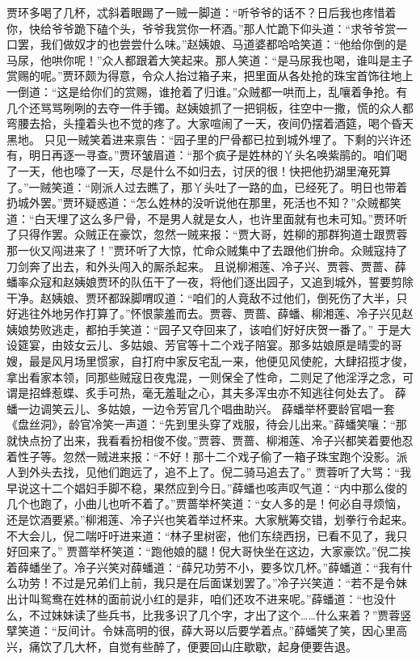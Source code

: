 \documentclass[12pt,oneside]{book}
\begin{document}
贾环多喝了几杯，忒斜着眼踢了一贼一脚道：“听爷爷的话不？日后我也疼惜着你，快给爷爷跪下磕个头，爷爷我赏你一杯酒。”那人忙跪下仰头道：“求爷爷赏一口罢，我们做奴才的也尝尝什么味。”赵姨娘、马道婆都哈哈笑道：“他给你倒的是马尿，他哄你呢！”众人都跟着大笑起来。那人笑道：“是马尿我也喝，谁叫是主子赏赐的呢。”贾环颇为得意，令众人抬过箱子来，把里面从各处抢的珠宝首饰往地上一倒道：“这是给你们的赏赐，谁抢着了归谁。”众贼都一哄而上，乱嚷着争抢。有几个还骂骂咧咧的去夺一件手镯。赵姨娘抓了一把铜板，往空中一撒，慌的众人都弯腰去拾，头撞着头也不觉的疼了。大家喧闹了一天，夜间仍摆着酒筵，喝个昏天黑地。
只见一贼笑着进来禀告：“园子里的尸骨都已拉到城外埋了。下剩的兴许还有，明日再逐一寻查。”贾环皱眉道：“那个疯子是姓林的丫头名唤紫鹃的。咱们喝了一天，他也嚎了一天，尽是什么不如归去，讨厌的很！快把他扔湖里淹死算了。”一贼笑道：“刚派人过去瞧了，那丫头吐了一路的血，已经死了。明日也带着扔城外罢。”贾环疑惑道：“怎么姓林的没听说他在那里，死活也不知？”众贼都笑道：“白天埋了这么多尸骨，不是男人就是女人，也许里面就有也未可知。”贾环听了只得作罢。众贼正在豪饮，忽然一贼来报：“贾大哥，姓柳的那群狗道士跟贾蓉那一伙又闯进来了！”贾环听了大惊，忙命众贼集中了去跟他们拚命。众贼寇持了刀剑奔了出去，和外头闯入的厮杀起来。
且说柳湘莲、冷子兴、贾蓉、贾蔷、薛蟠率众寇和赵姨娘贾环的队伍干了一夜，将他们逐出园子，又追到城外，誓要剪除干净。赵姨娘、贾环都跺脚喟叹道：“咱们的人竟敌不过他们，倒死伤了大半，只好逃往外地另作打算了。”怀恨蒙羞而去。贾蓉、贾蔷、薛蟠、柳湘莲、冷子兴见赵姨娘势败逃走，都拍手笑道：“园子又夺回来了，该咱们好好庆贺一番了。”
于是大设筵宴，由妓女云儿、多姑娘、芳官等十二个戏子陪宴。那多姑娘原是晴雯的哥嫂，最是风月场里惯家，自打府中家反宅乱一来，他便见风使舵，大肆招揽才俊，拿出看家本领，同那些贼寇日夜鬼混，一则保全了性命，二则足了他淫浮之念，可谓是招蜂惹蝶、炙手可热，毫无羞耻之心，其夫多浑虫亦不知逃往何处去了。
薛蟠一边调笑云儿、多姑娘，一边令芳官几个唱曲助兴。
薛蟠举杯要龄官唱一套《盘丝洞》，龄官冷笑一声道：“先到里头穿了戏服，待会儿出来。”薛蟠笑嚷：“那就快点扮了出来，我看看扮相俊不俊。”贾蓉、贾蔷、柳湘莲、冷子兴都笑着要他忍着性子等。忽然一贼进来报：“不好！那十二个戏子偷了一箱子珠宝跑个没影。派人到外头去找，见他们跑远了，追不上了。倪二骑马追去了。”
贾蓉听了大骂：“我早说这十二个娼妇手脚不稳，果然应到今日。”薛蟠也咳声叹气道：“内中那么俊的几个也跑了，小曲儿也听不着了。”贾蔷举杯笑道：“女人多的是！何必自寻烦恼，还是饮酒要紧。”柳湘莲、冷子兴也笑着举过杯来。大家觥筹交错，划拳行令起来。不大会儿，倪二喘吁吁进来道：“林子里树密，他们东绕西拐，已看不见了，我只好回来了。”
贾蔷举杯笑道：“跑他娘的腿！倪大哥快坐在这边，大家豪饮。”倪二挨着薛蟠坐了。冷子兴笑对薛蟠道：“薛兄功劳不小，要多饮几杯。”薛蟠道：“我有什么功劳！不过是兄弟们上前，我只是在后面谋划罢了。”冷子兴笑道：“若不是令妹出计叫鸳鸯在姓林的面前说小红的是非，咱们还攻不进来呢。”薛蟠道：“也没什么，不过妹妹读了些兵书，比我多识了几个字，才出了这个……什么来着？”贾蓉竖擘笑道：“反间计。令妹高明的很，薛大哥以后要学着点。”薛蟠笑了笑，因心里高兴，痛饮了几大杯，自觉有些醉了，便要回山庄歇歇，起身便要告退。
\end{document}
